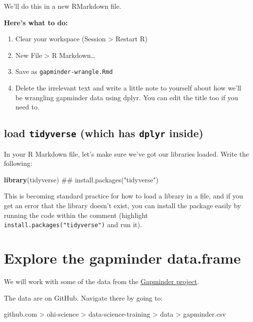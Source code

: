 \documentclass[]{book}
\newenvironment{Shaded}{\begin{snugshade}}{\end{snugshade}}
\newcommand{\KeywordTok}[1]{\textcolor[rgb]{0.13,0.29,0.53}{\textbf{{#1}}}}
\newcommand{\NormalTok}[1]{{#1}}
\providecommand{\tightlist}{%
  \setlength{\itemsep}{0pt}\setlength{\parskip}{0pt}}
\theoremstyle{definition}
\theoremstyle{definition}
\theoremstyle{definition}
\theoremstyle{remark}
\begin{document}
We'll do this in a new RMarkdown file.

\textbf{Here's what to do:}

\begin{enumerate}
\def\labelenumi{\arabic{enumi}.}
\tightlist
\item
  Clear your workspace (Session \textgreater{} Restart R)
\item
  New File \textgreater{} R Markdown\ldots{}
\item
  Save as \texttt{gapminder-wrangle.Rmd}
\item
  Delete the irrelevant text and write a little note to yourself about
  how we'll be wrangling gapminder data using dplyr. You can edit the
  title too if you need to.
\end{enumerate}

\subsection{\texorpdfstring{load \texttt{tidyverse} (which has
\texttt{dplyr}
inside)}{load tidyverse (which has dplyr inside)}}\label{load-tidyverse-which-has-dplyr-inside}

In your R Markdown file, let's make sure we've got our libraries loaded.
Write the following:

\begin{Shaded}
\begin{Highlighting}[]
\KeywordTok{library}\NormalTok{(tidyverse)     ## install.packages("tidyverse")}
\end{Highlighting}
\end{Shaded}

This is becoming standard practice for how to load a library in a file,
and if you get an error that the library doesn't exist, you can install
the package easily by running the code within the comment (highlight
\texttt{install.packages("tidyverse")} and run it).

\section{Explore the gapminder
data.frame}\label{explore-the-gapminder-data.frame}

We will work with some of the data from the
\href{http://www.gapminder.org}{Gapminder project}.

The data are on GitHub. Navigate there by going to:

github.com \textgreater{} ohi-science \textgreater{}
data-science-training \textgreater{} data \textgreater{} gapminder.csv
\end{document}
